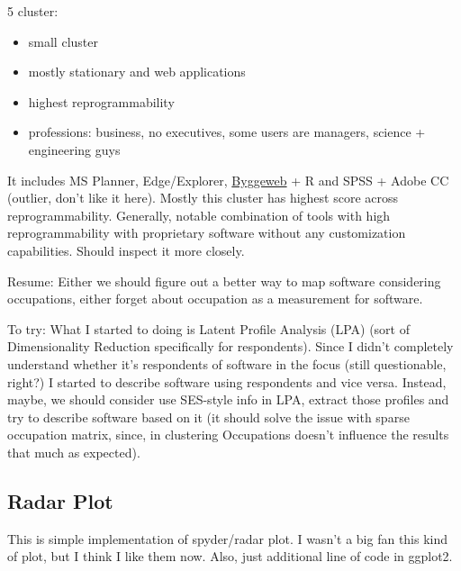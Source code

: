 \documentclass[]{article}
\providecommand{\tightlist}{%
  \setlength{\itemsep}{0pt}\setlength{\parskip}{0pt}}
\begin{document}
5 cluster:

\begin{itemize}
\tightlist
\item
  small cluster
\item
  mostly stationary and web applications
\item
  highest reprogrammability
\item
  professions: business, no executives, some users are managers, science
  + engineering guys
\end{itemize}

It includes MS Planner, Edge/Explorer,
\href{https://www.rib-software.dk/}{Byggeweb} + R and SPSS + Adobe CC
(outlier, don't like it here). Mostly this cluster has highest score
across reprogrammability. Generally, notable combination of tools with
high reprogrammability with proprietary software without any
customization capabilities. Should inspect it more closely.

Resume: Either we should figure out a better way to map software
considering occupations, either forget about occupation as a measurement
for software.

To try: What I started to doing is Latent Profile Analysis (LPA) (sort
of Dimensionality Reduction specifically for respondents). Since I
didn't completely understand whether it's respondents of software in the
focus (still questionable, right?) I started to describe software using
respondents and vice versa. Instead, maybe, we should consider use
SES-style info in LPA, extract those profiles and try to describe
software based on it (it should solve the issue with sparse occupation
matrix, since, in clustering Occupations doesn't influence the results
that much as expected).

\subsection{Radar Plot}\label{radar-plot}

This is simple implementation of spyder/radar plot. I wasn't a big fan
this kind of plot, but I think I like them now. Also, just additional
line of code in ggplot2.
\end{document}
